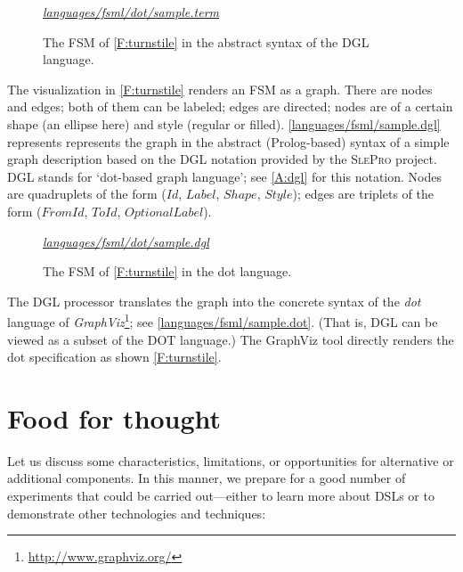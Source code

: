 \documentclass[preprint,authoryear,12pt]{noelsarticle}
\newcommand{\m}[1]{\ensuremath{\mathit{#1}}}
\newcommand{\slepro}{\textsc{SlePro}}
\newcommand{\codefigure}[3]{
\begin{figure}[t!]
\begin{boxedminipage}{\hsize}
\mbox{}\hfill{}{\small\textit{\href{http://github.com/slebok/slepro/tree/master/#2}{#2}}}

\end{boxedminipage}
\caption{#1.}
\label{#2}
\medskip
\end{figure}}
\begin{document}
\codefigure{%
The FSM of \autoref{F:turnstile} in the abstract syntax of the DGL language}{%
languages/fsml/dot/sample.term}{%
prolog}

The visualization in \autoref{F:turnstile} renders an FSM as a
graph. There are nodes and edges; both of them can be labeled; edges
are directed; nodes are of a certain shape (an ellipse here) and style
(regular or filled). \autoref{languages/fsml/sample.dgl} represents
represents the graph in the abstract (Prolog-based) syntax of a simple
graph description based on the DGL notation provided by the \slepro{}
project. DGL stands for `dot-based graph language'; see \ref{A:dgl}
for this notation. Nodes are quadruplets of the form (\m{Id},
\m{Label}, \m{Shape}, \m{Style}); edges are triplets of the form
(\m{FromId}, \m{ToId}, \m{OptionalLabel}).

\codefigure{%
The FSM of \autoref{F:turnstile} in the dot language}{%
languages/fsml/dot/sample.dgl}{%
dot}

The DGL processor translates the graph into the concrete syntax
of the \emph{dot} language of
\emph{GraphViz}\footnote{\url{http://www.graphviz.org/}}; see
\autoref{languages/fsml/sample.dot}. (That is, DGL can be viewed as a 
subset of the DOT language.) The GraphViz tool
directly renders the dot specification as shown \autoref{F:turnstile}.


\section{Food for thought}
\label{S:concl}

Let us discuss some characteristics, limitations, or opportunities
for alternative or additional components. In this manner, we prepare
for a good number of experiments that could be carried out---either to
learn more about DSLs or to demonstrate other technologies and
techniques:
\end{document}
